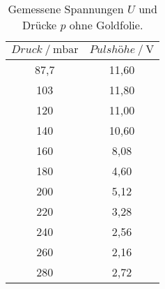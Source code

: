 \begin{table}[H] 
   \centering 
   \caption{Gemessene Spannungen $U$ und Drücke $p$ ohne Goldfolie.} 
   \label{tab:ohne} 
   \begin{tabular} { c c } 
 \toprule 
 {$Druck\:/\: \mathrm{mbar}$} & {$Pulshöhe\:/\: \mathrm{V}$} \\ 
    \midrule 
    87,7 & 11,60 \\ 
    103 & 11,80 \\ 
    120 & 11,00 \\ 
    140 & 10,60 \\ 
    160 & 8,08 \\ 
    180 & 4,60 \\ 
    200 & 5,12 \\ 
    220 & 3,28 \\ 
    240 & 2,56 \\ 
    260 & 2,16 \\ 
    280 & 2,72 \\ 
    \bottomrule 
  \end{tabular}
\end{table}
